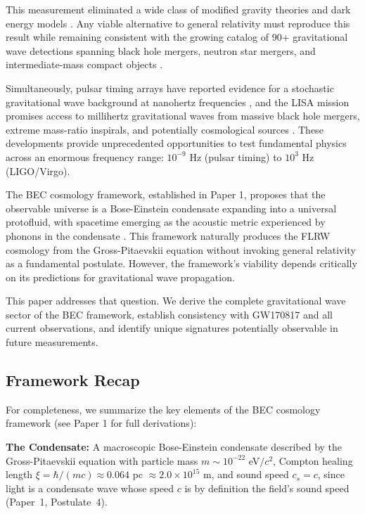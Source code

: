 \documentclass[11pt,a4paper]{article}
\newcommand{\cs}{\ensuremath{c_s}}
\theoremstyle{definition}
\theoremstyle{remark}
\begin{document}
This measurement eliminated a wide class of modified gravity theories and dark energy models \cite{Ezquiaga2018}. Any viable alternative to general relativity must reproduce this result while remaining consistent with the growing catalog of 90+ gravitational wave detections spanning black hole mergers, neutron star mergers, and intermediate-mass compact objects \cite{LIGOVirgo2021}.

Simultaneously, pulsar timing arrays have reported evidence for a stochastic gravitational wave background at nanohertz frequencies \cite{NANOGrav2023}, and the LISA mission promises access to millihertz gravitational waves from massive black hole mergers, extreme mass-ratio inspirals, and potentially cosmological sources \cite{LISA2017}. These developments provide unprecedented opportunities to test fundamental physics across an enormous frequency range: $10^{-9}$ Hz (pulsar timing) to $10^{3}$ Hz (LIGO/Virgo).

The BEC cosmology framework, established in Paper 1, proposes that the observable universe is a Bose-Einstein condensate expanding into a universal protofluid, with spacetime emerging as the acoustic metric experienced by phonons in the condensate \cite{Paper1}. This framework naturally produces the FLRW cosmology from the Gross-Pitaevskii equation without invoking general relativity as a fundamental postulate. However, the framework's viability depends critically on its predictions for gravitational wave propagation.

This paper addresses that question. We derive the complete gravitational wave sector of the BEC framework, establish consistency with GW170817 and all current observations, and identify unique signatures potentially observable in future measurements.

\subsection{Framework Recap}
\label{sec:framework_recap}

For completeness, we summarize the key elements of the BEC cosmology framework (see Paper 1 for full derivations):

\textbf{The Condensate:} A macroscopic Bose-Einstein condensate described by the Gross-Pitaevskii equation with particle mass $m \sim 10^{-22}$ eV$/c^2$, Compton healing length $\xi = \hbar/(mc) \approx 0.064$ pc $\approx 2.0 \times 10^{15}$ m, and sound speed $\cs = c$, since light is a condensate wave whose speed $c$ is by definition the field's sound speed (Paper~1, Postulate~4).
\end{document}
